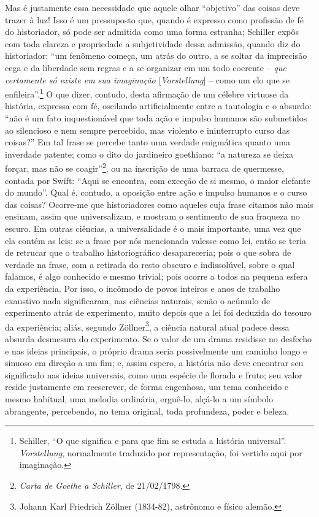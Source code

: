 Mas é justamente essa necessidade que aquele olhar ``objetivo'' das
coisas deve trazer à luz! Isso é um pressuposto que, quando é expresso
como profissão de fé do historiador, só pode ser admitida como uma forma
estranha; Schiller expôs com toda clareza e propriedade a subjetividade
dessa admissão, quando diz do historiador: ``um fenômeno começa, um
atrás do outro, a se soltar da imprecisão cega e da liberdade sem regras
e a se organizar em um todo coerente -- \emph{que certamente só existe
em sua imaginação} {[}\emph{Vorstellung}{]} -- como um elo que se
enfileira''.\footnote{Schiller, ``O que significa e para que fim se
  estuda a história universal''. \emph{Vorstellung}, normalmente
  traduzido por representação, foi vertido aqui por imaginação.} O que
dizer, contudo, desta afirmação de um célebre virtuose da história,
expressa com fé, oscilando artificialmente entre a tautologia e o
absurdo: ``não é um fato inquestionável que toda ação e impulso humanos
são submetidos ao silencioso e nem sempre percebido, mas violento e
ininterrupto curso das coisas?'' Em tal frase se percebe tanto uma
verdade enigmática quanto uma inverdade patente; como o dito do
jardineiro goethiano: ``a natureza se deixa forçar, mas não se
coagir''\footnote{\emph{Carta de Goethe a Schiller,} de 21/02/1798.}, ou na
inscrição de uma barraca de quermesse, contada por Swift: ``Aqui se
encontra, com exceção de si mesmo, o maior elefante do mundo''. Qual é,
contudo, a oposição entre ação e impulso humanos e o curso das coisas?
Ocorre-me que historiadores como aqueles cuja frase citamos não mais
ensinam, assim que universalizam, e mostram o sentimento de sua fraqueza
no escuro. Em outras ciências, a universalidade é o mais importante, uma
vez que ela contém as leis: se a frase por nós mencionada valesse como
lei, então se teria de retrucar que o trabalho historiográfico
desapareceria; pois o que sobra de verdade na frase, com a retirada do
resto obscuro e indissolúvel, sobre o qual falamos, é algo conhecido e
mesmo trivial; pois ocorre a todos na pequena esfera da experiência. Por
isso, o incômodo de povos inteiros e anos de trabalho exaustivo nada
significaram, nas ciências naturais, senão o acúmulo de experimento
atrás de experimento, muito depois que a lei foi deduzida do tesouro da
experiência; aliás, segundo Zöllner\footnote{Johann Karl Friedrich
  Zöllner (1834-82), astrônomo e físico alemão.}, a ciência natural
atual padece dessa absurda desmesura do experimento. Se o valor de um
drama residisse no desfecho e nas ideias principais, o próprio drama
seria possivelmente um caminho longo e sinuoso em direção a um fim; e,
assim espero, a história não deve encontrar seu significado nas ideias
universais, como uma espécie de florada e fruto; seu valor reside
justamente em reescrever, de forma engenhosa, um tema conhecido e mesmo
habitual, uma melodia ordinária, erguê-lo, alçá-lo a um símbolo
abrangente, percebendo, no tema original, toda profundeza, poder e
beleza.

